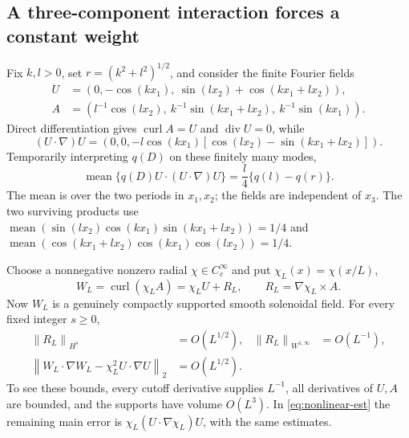 \documentclass[11pt]{article}
\theoremstyle{remark}
\newcommand{\curl}{\operatorname{curl}}
\newcommand{\diver}{\operatorname{div}}
\newcommand{\mean}{\operatorname{mean}}
\newcommand{\norm}[1]{\left\lVert#1\right\rVert}
\begin{document}
\subsection{A three-component interaction forces a constant weight}
Fix $k,l>0$, set $r=(k^2+l^2)^{1/2}$, and consider the finite Fourier fields
\begin{align}
 U&=(0,-\cos(kx_1),\ \sin(lx_2)+\cos(kx_1+lx_2)),\label{eq:triad-U}\\
 A&=(l^{-1}\cos(lx_2),\ k^{-1}\sin(kx_1+lx_2),\ k^{-1}\sin(kx_1)).
 \label{eq:triad-A}
\end{align}
Direct differentiation gives $\curl A=U$ and $\diver U=0$, while
\begin{equation}
 (U\cdot\nabla)U
  =(0,0,-l\cos(kx_1)[\cos(lx_2)-\sin(kx_1+lx_2)]).
 \label{eq:triad-nonlinearity}
\end{equation}
Temporarily interpreting $q(D)$ on these finitely many modes,
\begin{equation}
 \mean\{q(D)U\cdot (U\cdot\nabla)U\}
                     =\frac l4\{q(l)-q(r)\}.\label{eq:triad-mean}
\end{equation}
The mean is over the two periods in $x_1,x_2$; the fields are independent
of $x_3$. The two surviving products use
$\mean(\sin(lx_2)\cos(kx_1)\sin(kx_1+lx_2))=1/4$ and
$\mean(\cos(kx_1+lx_2)\cos(kx_1)\cos(lx_2))=1/4$.

Choose a nonnegative nonzero radial $\chi\in C_c^\infty$ and put
$\chi_L(x)=\chi(x/L)$,
\begin{equation}
 W_L=\curl(\chi_L A)=\chi_LU+R_L,
 \qquad R_L=\nabla\chi_L\times A.\label{eq:localized-triad}
\end{equation}
Now $W_L$ is a genuinely compactly supported smooth solenoidal field.
For every fixed integer $s\ge0$,
\begin{align}
 \norm{R_L}_{H^s}&=O(L^{1/2}),&
 \norm{R_L}_{W^{1,\infty}}&=O(L^{-1}),\label{eq:remainder-est}\\
 \norm{W_L\cdot\nabla W_L-\chi_L^2U\cdot\nabla U}_2
                         &=O(L^{1/2}).\label{eq:nonlinear-est}
\end{align}
To see these bounds, every cutoff derivative supplies $L^{-1}$,
all derivatives of $U,A$ are bounded, and the supports have volume
$O(L^3)$. In \eqref{eq:nonlinear-est} the remaining main error is
$\chi_L(U\cdot\nabla\chi_L)U$, with the same estimates.
\end{document}
